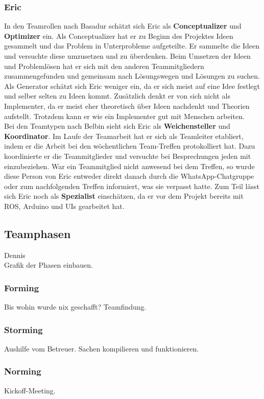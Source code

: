 \documentclass[a4paper,12pt,headsepline]{scrartcl}
\begin{document}
		\subsubsection{Eric}
		In den Teamrollen nach Basadur schätzt sich Eric als \textbf{Conceptualizer} und \textbf{Optimizer} ein. Als Conceptualizer hat er zu Beginn des Projektes Ideen gesammelt und das Problem in Unterprobleme aufgeteilte. Er sammelte die Ideen und versuchte diese umzusetzen und zu überdenken. Beim Umsetzen der Ideen und Problemlösen hat er sich mit den anderen Teammitgliedern zusammengefunden und gemeinsam nach Lösungswegen und Lösungen zu suchen. Als Generator schätzt sich Eric weniger ein, da er sich meist auf eine Idee festlegt und selber selten zu Ideen kommt. Zusätzlich denkt er von sich nicht als Implementer, da er meist eher theoretisch über Ideen nachdenkt und Theorien aufstellt. Trotzdem kann er wie ein Implementer gut mit Menschen arbeiten.\\
		Bei den Teamtypen nach Belbin sieht sich Eric als \textbf{Weichensteller} und \textbf{Koordinator}. Im Laufe der Teamarbeit hat er sich als Teamleiter etabliert, indem er die Arbeit bei den wöchentlichen Team-Treffen protokolliert hat. Dazu koordinierte er die Teammitglieder und versuchte bei Besprechungen jeden mit einzubeziehen. War ein Teammitglied nicht anwesend bei dem Treffen, so wurde diese Person von Eric entweder direkt danach durch die WhatsApp-Chatgruppe oder zum nachfolgenden Treffen informiert, was sie verpasst hatte. Zum Teil lässt sich Eric noch als \textbf{Spezialist} einschätzen, da er vor dem Projekt bereits mit ROS, Arduino und UIs gearbeitet hat.\\
	\subsection{Teamphasen}
		Dennis\\
		Grafik der Phasen einbauen.
	\subsubsection{Forming}
		Bis wohin wurde nix geschafft? Teamfindung.
	\subsubsection{Storming}
		Aushilfe vom Betreuer. Sachen kompilieren und funktionieren.
	\subsubsection{Norming}
		Kickoff-Meeting. 
\end{document}
